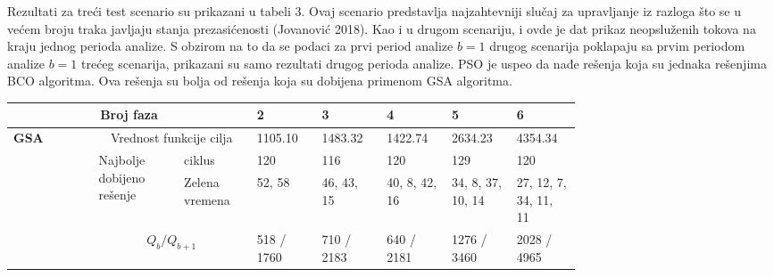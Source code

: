 Rezultati za treći test scenario su prikazani u tabeli 3. Ovaj scenario predstavlja najzahtevniji slučaj za upravljanje iz razloga što se u većem broju traka javljaju stanja prezasićenosti (Jovanović 2018). Kao i u drugom scenariju, i ovde je dat prikaz neopsluženih tokova na kraju jednog perioda analize. S obzirom na to da se podaci za prvi period analize $b=1$ drugog scenarija poklapaju sa prvim periodom analize $b=1$ trećeg scenarija, prikazani su samo rezultati drugog perioda analize. PSO je uspeo da nađe rešenja koja su jednaka rešenjima BCO algoritma. Ova rešenja su bolja od rešenja koja su dobijena primenom GSA algoritma. 


\begin{table*}
    \begin{center}
      \begin{tabular}{p{0.12\linewidth}p{0.12\linewidth}p{0.1\linewidth}p{0.08\linewidth}p{0.08\linewidth}p{0.08\linewidth}p{0.08\linewidth}p{0.08\linewidth}}
        \hline 
        \multicolumn{3}{c}{Broj faza} & 2 & 3 & 4 & 5 & 6 \\ 
        \hline 
        \multirow{4}{4em}{\textbf{GSA}} & \multicolumn{2}{c}{Vrednost funkcije cilja}                    
        & 1105.10 & 1483.32 & 1422.74 & 2634.23 & 4354.34 \\
        \cmidrule{2-8}
        & \multirow{2}{0.9\linewidth}{Najbolje dobijeno rešenje} & ciklus 
        & 120 & 116 & 120 & 129 & 120 \\
                               \cmidrule{3-8}
                               &  & Zelena vremena   
        &  52, 58 &   46, 43, 15 & 40, 8, 42, 16 & 34, 8, 37, 10, 14 & 27, 12, 7, 34, 11, 11 \\
        \cmidrule{2-8}
        & \multicolumn{2}{c}{$ Q_b / Q_{b+1}$} 
        & 518 / 1760 & 710 / 2183 & 640 / 2181 & 1276 / 3460 & 2028 / 4965 \\
        

\end{tabular}
\end{center}
\end{table*}
